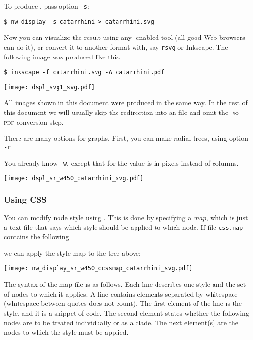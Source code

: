 To produce \svg, pass option \texttt{-s}:
\begin{verbatim}
$ nw_display -s catarrhini > catarrhini.svg
\end{verbatim}
Now you can visualize the result using any \svg-enabled tool (all good Web browsers can do it), or convert it to another format with, say \texttt{rsvg} or Inkscape. The following image was produced like this:

\begin{verbatim}
$ inkscape -f catarrhini.svg -A catarrhini.pdf
\end{verbatim}

\begin{center}
 \texttt{[image: dspl\_svg1\_svg.pdf]}
\end{center}
All \svg{} images shown in this document were produced in the same way. In the
rest of this document we will usually skip the redirection into an \svg{} file
and omit the \svg{}-to-\textsc{pdf} conversion step.

There are many options for \svg{} graphs. First, you can make radial trees,
using option \texttt{-r} 

You already know \texttt{-w}, except that for \svg{} the value is in pixels instead of columns. 

\begin{center}
\texttt{[image: dspl\_sr\_w450\_catarrhini\_svg.pdf]}
\end{center}

\subsubsection{Using CSS}
\label{sct_display_svg_css}

You can modify node style using \css. This is done by specifying a
\textit{\css{} map}, which is just a text file that says which style should be
applied to which node. If file \texttt{css.map} contains the following
\begin{quote}  \end{quote} we can apply the style map to
the tree above:



\begin{center}
 \texttt{[image: nw\_display\_sr\_w450\_ccssmap\_catarrhini\_svg.pdf]}
\end{center}

The syntax of the \css{} map file is as follows. Each line describes one style
and the set of nodes to which it applies. A line contains elements separated by
whitespace (whitespace between quotes does not count). The first element of the
line is the style, and it is a snippet of \css{} code. The second element
states whether the following nodes are to be treated individually or as a
clade. The next element(s) are the nodes to which the style must be applied. 

